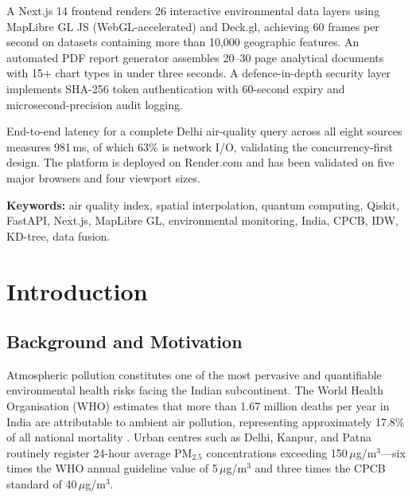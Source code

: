 \documentclass[12pt,a4paper]{article}
\begin{document}
A Next.js 14 frontend renders 26 interactive environmental data layers using
MapLibre GL JS (WebGL-accelerated) and Deck.gl, achieving 60 frames per second
on datasets containing more than 10,000 geographic features. An automated PDF
report generator assembles 20--30 page analytical documents with 15+ chart
types in under three seconds. A defence-in-depth security layer implements
SHA-256 token authentication with 60-second expiry and microsecond-precision
audit logging.

End-to-end latency for a complete Delhi air-quality query across all eight
sources measures 981\,ms, of which 63\% is network I/O, validating the
concurrency-first design. The platform is deployed on Render.com and has
been validated on five major browsers and four viewport sizes.

\vspace{0.5em}
\noindent\textbf{Keywords:} air quality index, spatial interpolation, quantum
computing, Qiskit, FastAPI, Next.js, MapLibre GL, environmental monitoring,
India, CPCB, IDW, KD-tree, data fusion.

\clearpage

\tableofcontents
\clearpage

\listoffigures
\clearpage

\listoftables
\clearpage
\section{Introduction}
\label{sec:intro}

\subsection{Background and Motivation}
\label{sec:intro:background}

Atmospheric pollution constitutes one of the most pervasive and quantifiable
environmental health risks facing the Indian subcontinent. The World Health
Organisation (WHO) estimates that more than 1.67 million deaths per year in
India are attributable to ambient air pollution, representing approximately
17.8\% of all national mortality \cite{who2021}. Urban centres such as Delhi,
Kanpur, and Patna routinely register 24-hour average $\text{PM}_{2.5}$
concentrations exceeding 150\,$\mu$g/m$^{3}$---six times the WHO annual
guideline value of 5\,$\mu$g/m$^{3}$ and three times the CPCB standard of
40\,$\mu$g/m$^{3}$.
\end{document}
